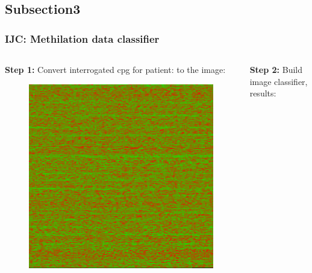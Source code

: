 \documentclass[10pt, xcolor=x11names,compress]{beamer}
\begin{document}
\subsection{Subsection3}
\begin{frame}
\frametitle{IJC: Methilation data classifier}
	\begin{columns}
		\begin{column}{0.5\textwidth}
			\textbf{Step 1:}
			\newline
			Convert interrogated cpg for patient:
			\newline
			[0.92, 0.77, 0.81, ..., 0.09, 0.62]
			to the image:
			\begin{figure}
				\centering
				\includegraphics[height=0.4\textheight]{images/methilation_data.png}
			\end{figure}
		\end{column}
	\begin{column}{0.5\textwidth}
		\textbf{Step 2:}
		\newline
		Build image classifier, results:
		\newline
		\begin{figure}
			\centering

\end{figure}
\end{column}
\end{columns}
\end{frame}
\end{document}
